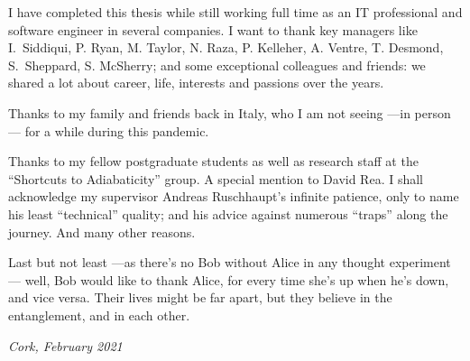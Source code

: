 {
  I have completed this thesis while still working
  full time as an IT professional and
  software engineer in several companies.
  I want to thank key managers like
  I.~Siddiqui, P. Ryan, M. Taylor, N. Raza, P. Kelleher, A. Ventre, T. Desmond, S.~Sheppard, S. McSherry;
  and some exceptional colleagues and friends:
  we shared a lot about career, life, interests and passions over the years.

  Thanks to my family and friends back in Italy,
  who I am not seeing ---in person--- for a while during this pandemic.

  Thanks to my fellow postgraduate students
  as well as research staff
  at the ``Shortcuts to Adiabaticity'' group.
  A special mention to David Rea.
  I shall acknowledge my supervisor Andreas Ruschhaupt's infinite patience,
  only to name his least ``technical'' quality;
  and his advice against numerous ``traps'' along the journey. And many other reasons.

  Last but not least ---as there's no Bob without Alice in any thought ex\-per\-i\-ment---
  well, Bob would like to thank Alice,
  for every time she’s up when he’s down, and vice versa.
  Their lives might be far apart,
  but they believe in the entanglement,
  and in each other.

  \emph{Cork, February 2021}
}
